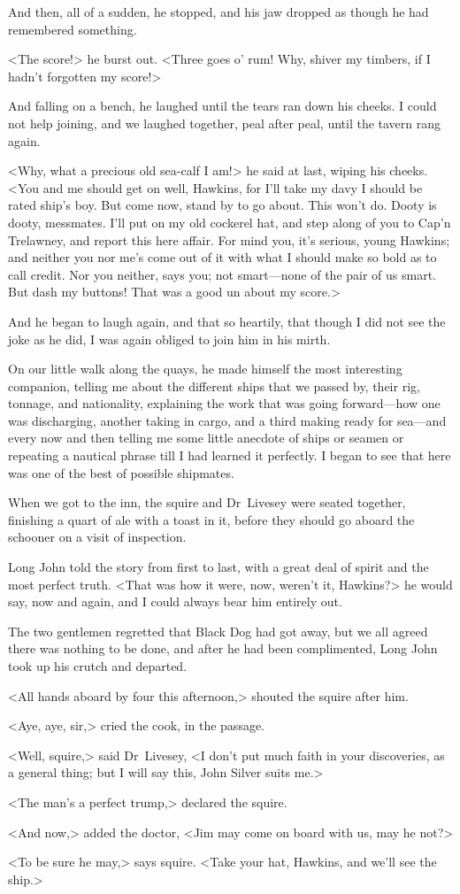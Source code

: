 And then, all of a sudden, he stopped, and his jaw dropped as though he had remembered something.

<The score!> he burst out. <Three goes o' rum! Why, shiver my timbers, if I hadn't forgotten my score!>

And falling on a bench, he laughed until the tears ran down his cheeks. I could not help joining, and we laughed together, peal after peal, until the tavern rang again.

<Why, what a precious old sea-calf I am!> he said at last, wiping his cheeks. <You and me should get on well, Hawkins, for I'll take my davy I should be rated ship's boy. But come now, stand by to go about. This won't do. Dooty is dooty, messmates. I'll put on my old cockerel hat, and step along of you to Cap'n Trelawney, and report this here affair. For mind you, it's serious, young Hawkins; and neither you nor me's come out of it with what I should make so bold as to call credit. Nor you neither, says you; not smart—none of the pair of us smart. But dash my buttons! That was a good un about my score.>

And he began to laugh again, and that so heartily, that though I did not see the joke as he did, I was again obliged to join him in his mirth.

On our little walk along the quays, he made himself the most interesting companion, telling me about the different ships that we passed by, their rig, tonnage, and nationality, explaining the work that was going forward—how one was discharging, another taking in cargo, and a third making ready for sea—and every now and then telling me some little anecdote of ships or seamen or repeating a nautical phrase till I had learned it perfectly. I began to see that here was one of the best of possible shipmates.

When we got to the inn, the squire and Dr~Livesey were seated together, finishing a quart of ale with a toast in it, before they should go aboard the schooner on a visit of inspection.

Long John told the story from first to last, with a great deal of spirit and the most perfect truth. <That was how it were, now, weren't it, Hawkins?> he would say, now and again, and I could always bear him entirely out.

The two gentlemen regretted that Black Dog had got away, but we all agreed there was nothing to be done, and after he had been complimented, Long John took up his crutch and departed.

<All hands aboard by four this afternoon,> shouted the squire after him.

<Aye, aye, sir,> cried the cook, in the passage.

<Well, squire,> said Dr~Livesey, <I don't put much faith in your discoveries, as a general thing; but I will say this, John Silver suits me.>

<The man's a perfect trump,> declared the squire.

<And now,> added the doctor, <Jim may come on board with us, may he not?>

<To be sure he may,> says squire. <Take your hat, Hawkins, and we'll see the ship.>